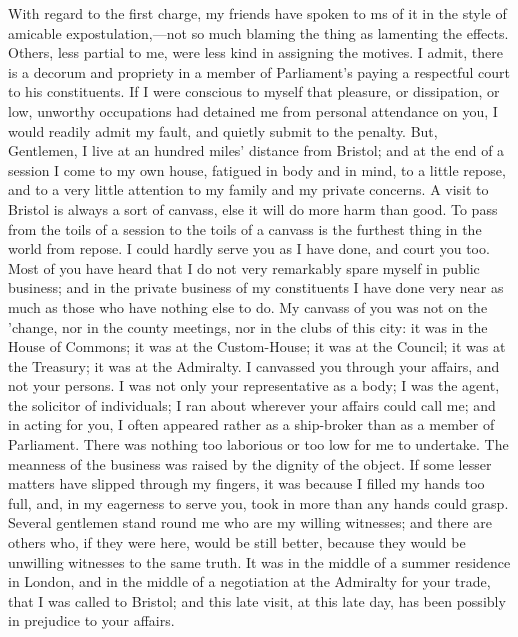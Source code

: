 With regard to the first charge, my friends have spoken to ms of it in the style of amicable expostulation,—not so much blaming the thing as lamenting the effects. Others, less partial to me, were less kind in assigning the motives. I admit, there is a decorum and propriety in a member of Parliament's paying a respectful court to his constituents. If I were conscious to myself that pleasure, or dissipation, or low, unworthy occupations had detained me from personal attendance on you, I would readily admit my fault, and quietly submit to the penalty. But, Gentlemen, I live at an hundred miles' distance from Bristol; and at the end of a session I come to my own house, fatigued in body and in mind, to a little repose, and to a very little attention to my family and my private concerns. A visit to Bristol is always a sort of canvass, else it will do more harm than good. To pass from the toils of a session to the toils of a canvass is the furthest thing in the world from repose. I could hardly serve you as I have done, and court you too. Most of you have heard that I do not very remarkably spare myself in public business; and in the private business of my constituents I have done very near as much as those who have nothing else to do. My canvass of you was not on the 'change, nor in the county meetings, nor in the clubs of this city: it was in the House of Commons; it was at the Custom-House; it was at the Council; it was at the Treasury; it was at the Admiralty. I canvassed you through your affairs, and not your persons. I was not only your representative as a body; I was the agent, the solicitor of individuals; I ran about wherever your affairs could call me; and in acting for you, I often appeared rather as a ship-broker than as a member of Parliament. There was nothing too laborious or too low for me to undertake. The meanness of the business was raised by the dignity of the object. If some lesser matters have slipped through my fingers, it was because I filled my hands too full, and, in my eagerness to serve you, took in more than any hands could grasp. Several gentlemen stand round me who are my willing witnesses; and there are others who, if they were here, would be still better, because they would be unwilling witnesses to the same truth. It was in the middle of a summer residence in London, and in the middle of a negotiation at the Admiralty for your trade, that I was called to Bristol; and this late visit, at this late day, has been possibly in prejudice to your affairs.

